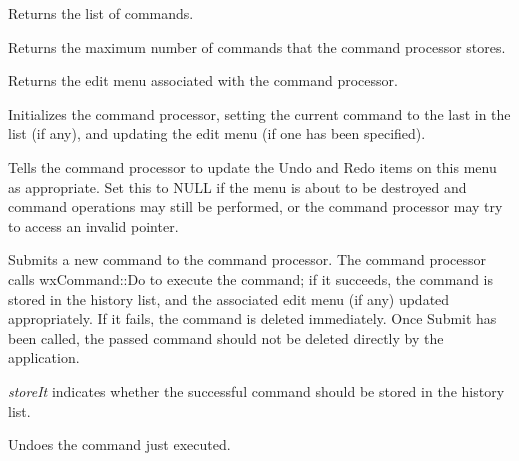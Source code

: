 Returns the list of commands.



Returns the maximum number of commands that the command processor stores.



Returns the edit menu associated with the command processor.



Initializes the command processor, setting the current command to the
last in the list (if any), and updating the edit menu (if one has been
specified).



Tells the command processor to update the Undo and Redo items on this
menu as appropriate. Set this to NULL if the menu is about to be
destroyed and command operations may still be performed, or the command
processor may try to access an invalid pointer.



Submits a new command to the command processor. The command processor
calls wxCommand::Do to execute the command; if it succeeds, the command
is stored in the history list, and the associated edit menu (if any) updated
appropriately. If it fails, the command is deleted
immediately. Once Submit has been called, the passed command should not
be deleted directly by the application.

{\it storeIt} indicates whether the successful command should be stored
in the history list.



Undoes the command just executed.


